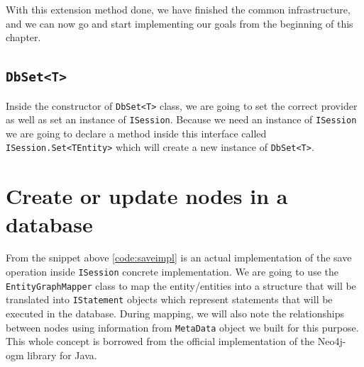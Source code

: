 With this extension method done, we have finished the common infrastructure, and we can now go and start implementing our
goals from the beginning of this chapter.

\subsection{\texttt{DbSet<T>}}

Inside the constructor of \texttt{DbSet<T>} class, we are going to set the correct provider as well as set an instance of \texttt{ISession}.
Because we need an instance of \texttt{ISession} we are going to declare a method inside this interface called
\texttt{ISession.Set<TEntity>} which will create a new instance
of \texttt{DbSet<T>}.

\section{Create or update nodes in a database}


From the snippet above \ref{code:saveimpl} is an actual implementation of the save operation inside \texttt{ISession} concrete implementation.
We are going to use the \texttt{EntityGraphMapper} class to map the entity/entities into a structure that will be translated into
\texttt{IStatement} objects which represent statements that will be executed in the database. During mapping, we will also note the relationships between nodes
using information from \texttt{MetaData} object we built for this purpose. This whole concept is borrowed from
the official implementation of the Neo4j-\acrshort{ogm} library for Java.

